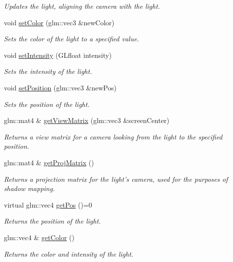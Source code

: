 \begin{DoxyCompactItemize}
\begin{DoxyCompactList}\small\item\em Updates the light, aligning the camera with the light. \end{DoxyCompactList}\item 
void \hyperlink{class_light_a32533dd404b4f87ef23cf3f2251a1044}{set\-Color} (glm\-::vec3 \&new\-Color)
\begin{DoxyCompactList}\small\item\em Sets the color of the light to a specified value. \end{DoxyCompactList}\item 
void \hyperlink{class_light_ab36e113dc58dd1e8dcd1f0d46d1a35c4}{set\-Intensity} (G\-Lfloat intensity)
\begin{DoxyCompactList}\small\item\em Sets the intensity of the light. \end{DoxyCompactList}\item 
void \hyperlink{class_light_ab730704ad744e475b294678c6d78ac3e}{set\-Position} (glm\-::vec3 \&new\-Pos)
\begin{DoxyCompactList}\small\item\em Sets the position of the light. \end{DoxyCompactList}\item 
glm\-::mat4 \& \hyperlink{class_light_a4d68a3ba56cc6fc694b4bccde4d4dd25}{get\-View\-Matrix} (glm\-::vec3 \&screen\-Center)
\begin{DoxyCompactList}\small\item\em Returns a view matrix for a camera looking from the light to the specified position. \end{DoxyCompactList}\item 
\hypertarget{class_light_a3738e9ea95b61669369d7d1d33734259}{glm\-::mat4 \& \hyperlink{class_light_a3738e9ea95b61669369d7d1d33734259}{get\-Proj\-Matrix} ()}\label{class_light_a3738e9ea95b61669369d7d1d33734259}

\begin{DoxyCompactList}\small\item\em Returns a projection matrix for the light's camera, used for the purposes of shadow mapping. \end{DoxyCompactList}\item 
virtual glm\-::vec4 \hyperlink{class_light_a22cfe8279c9acfc1eb5ae6bbb00c3a2c}{get\-Pos} ()=0
\begin{DoxyCompactList}\small\item\em Returns the position of the light. \end{DoxyCompactList}\item 
glm\-::vec4 \& \hyperlink{class_light_ab9718f63a12f2cb48401ef76987b21f9}{get\-Color} ()
\begin{DoxyCompactList}\small\item\em Returns the color and intensity of the light. \end{DoxyCompactList}\end{DoxyCompactItemize}
